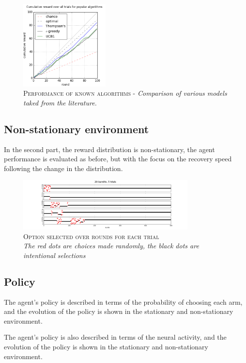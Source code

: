\begin{figure}[ht]
    \centering
    \includegraphics[width=0.4\textwidth]{figures/lit_models_.png}
    \caption{\textsc{Performance of known algorithms - }\textit{Comparison of various models taked from the literature.}}
    \label{fig.lit_models_1}
\end{figure}


\subsection{Non-stationary environment}
In the second part, the reward distribution is non-stationary, the agent performance is evaluated as before, but with the focus on the recovery speed following the change in the distribution.


\begin{figure}[ht]
    \centering
    \includegraphics[width=0.8\textwidth]{figures/minmod_a.png}
    \caption{\textsc{Option selected over rounds for each trial}\\\textit{The red dots are choices made randomly, the black dots are intentional selections}}
    \label{fig:results_minmod_a}
\end{figure}




\subsection{Policy}

The agent's policy is described in terms of the probability of choosing each arm, and the evolution of the policy is shown in the stationary and non-stationary environment.


\hfill \break
The agent's policy is also described in terms of the neural activity, and the evolution of the policy is shown in the stationary and non-stationary environment.



